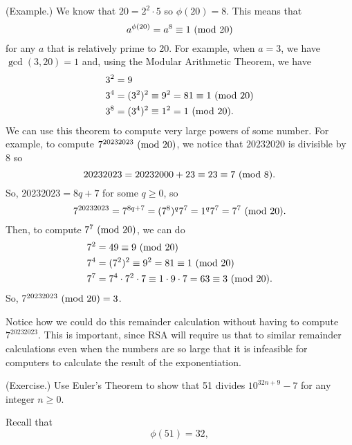 \documentclass[letterpaper]{article}
\begin{document}
\begin{mdframed}
    (Example.) We know that $20 = 2^2 \cdot 5$ so $\phi(20) = 8$. This means that \[a^{\phi(20)} = a^8 \equiv 1 \ (\mathrm{mod}\ 20)\] for any $a$ that is relatively prime to 20. For example, when $a = 3$, we have $\gcd(3, 20) = 1$ and, using the Modular Arithmetic Theorem, we have 
    \begin{equation*}
        \begin{aligned}
            &3^2 = 9 \\ 
            &3^4 = (3^2)^2 \equiv 9^2 = 81 \equiv 1 \ (\mathrm{mod}\ 20) \\ 
            &3^8 = (3^4)^2 \equiv 1^2 = 1 \ (\mathrm{mod}\ 20).
        \end{aligned}
    \end{equation*}
    We can use this theorem to compute very large powers of some number. For example, to compute $7^{20232023} \ (\mathrm{mod}\ 20)$, we notice that $20232020$ is divisible by 8 so 
    \[20232023 = 20232000 + 23 \equiv 23 \equiv 7 \ (\mathrm{mod}\ 8).\]
    So, $20232023 = 8q + 7$ for some $q \geq 0$, so 
    \[7^{20232023} = 7^{8q + 7} = (7^8)^q 7^7 = 1^q 7^7 = 7^7 \ (\mathrm{mod}\ 20).\]
    Then, to compute $7^7 \ (\mathrm{mod}\ 20)$, we can do 
    \begin{equation*}
        \begin{aligned}
            &7^2 = 49 \equiv 9 \ (\mathrm{mod}\ 20) \\ 
            &7^4 = (7^2)^2 \equiv 9^2 = 81 \equiv 1 \ (\mathrm{mod}\ 20) \\ 
            &7^7 = 7^4 \cdot 7^2 \cdot 7 \equiv 1 \cdot 9 \cdot 7 = 63 \equiv 3 \ (\mathrm{mod}\ 20).
        \end{aligned}
    \end{equation*}
    So, $7^{20232023} \ (\mathrm{mod}\ 20) = 3$. 
\end{mdframed}
Notice how we could do this remainder calculation without having to compute $7^{20232023}$. This is important, since RSA will require us that to similar remainder calculations even when the numbers are so large that it is infeasible for computers to calculate the result of the exponentiation. 

\begin{mdframed}
    (Exercise.) Use Euler's Theorem to show that 51 divides $10^{32n + 9} - 7$ for any integer $n \geq 0$. 

    \begin{mdframed}
        Recall that \[\phi(51) = 32,\]
    \end{mdframed}
\end{mdframed}
\end{document}
